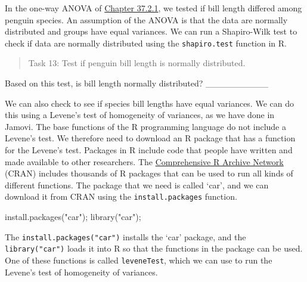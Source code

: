 \documentclass[
]{scrbook}
\newenvironment{Shaded}{\begin{snugshade}}{\end{snugshade}}
\newcommand{\AttributeTok}[1]{\textcolor[rgb]{0.77,0.63,0.00}{#1}}
\newcommand{\FunctionTok}[1]{\textcolor[rgb]{0.00,0.00,0.00}{#1}}
\newcommand{\NormalTok}[1]{#1}
\newcommand{\SpecialCharTok}[1]{\textcolor[rgb]{0.00,0.00,0.00}{#1}}
\newcommand{\StringTok}[1]{\textcolor[rgb]{0.31,0.60,0.02}{#1}}
\begin{document}
In the one-way ANOVA of \protect\hyperlink{one-way-anova-in-r}{Chapter 37.2.1}, we tested if bill length differed among penguin species.
An assumption of the ANOVA is that the data are normally distributed and groups have equal variances.
We can run a Shapiro-Wilk test to check if data are normally distributed using the \texttt{shapiro.test} function in R.

\begin{Shaded}
\end{Shaded}

\begin{quote}
Task 13: Test if penguin bill length is normally distributed.
\end{quote}

Based on this test, is bill length normally distributed? \_\_\_\_\_\_\_\_\_\_

We can also check to see if species bill lengths have equal variances.
We can do this using a Levene's test of homogeneity of variances, as we have done in Jamovi.
The base functions of the R programming language do not include a Levene's test.
We therefore need to download an R package that has a function for the Levene's test.
Packages in R include code that people have written and made available to other researchers.
The \href{https://cran.r-project.org/}{Comprehensive R Archive Network} (CRAN) includes thousands of R packages that can be used to run all kinds of different functions.
The package that we need is called `car', and we can download it from CRAN using the \texttt{install.packages} function.

\begin{Shaded}
\begin{Highlighting}[]
\FunctionTok{install.packages}\NormalTok{(}\StringTok{"car"}\NormalTok{);}
\FunctionTok{library}\NormalTok{(}\StringTok{"car"}\NormalTok{);}
\end{Highlighting}
\end{Shaded}

The \texttt{install.packages("car")} installs the `car' package, and the \texttt{library("car")} loads it into R so that the functions in the package can be used.
One of these functions is called \texttt{leveneTest}, which we can use to run the Levene's test of homogeneity of variances.
\end{document}
